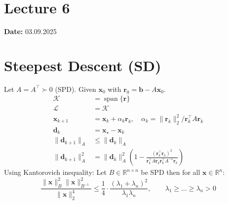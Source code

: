 \section{Lecture 6}
\textbf{Date:} 03.09.2025

\section*{Steepest Descent (SD)}
Let $A = A^{\top} \succ 0$ (SPD). Given $\mathbf{x}_0$ with $\mathbf{r}_0 = \mathbf{b} - A\mathbf{x}_0$.
\begin{align*}
    \mathcal{K}              & = \operatorname{span}\{\mathbf{r}\}                                                                                                                            \\
    \mathcal{L}              & = \mathcal{K}                                                                                                                                                  \\
    \mathbf{x}_{k+1}         & = \mathbf{x}_k + \alpha_k \mathbf{r}_k, \quad \alpha_k = \|\mathbf{r}_k\|_2^2 / \mathbf{r}_k^{\top} A \mathbf{r}_k                                             \\
    \mathbf{d}_k             & = \mathbf{x}_{\star} - \mathbf{x}_k                                                                                                                            \\
    \|\mathbf{d}_{k+1}\|_A   & \leq \|\mathbf{d}_k\|_A                                                                                                                                        \\
    \|\mathbf{d}_{k+1}\|_A^2 & = \|\mathbf{d}_k\|_A^2\left(1 - \frac{(\mathbf{r}_k^{\top} \mathbf{r}_k)^2}{\mathbf{r}_k^{\top} A \mathbf{r}_k \mathbf{r}_k^{\top} A^{-1} \mathbf{r}_k}\right)
\end{align*}
Using Kantorovich inequality: Let $B \in \mathbb{R}^{n \times n}$ be SPD then for all $\mathbf{x} \in \mathbb{R}^n$:
\[
    \frac{\|\mathbf{x}\|_B^2 \|\mathbf{x}\|_{B^{-1}}^2}{\|\mathbf{x}\|_2^4} \leq \frac{1}{4}\cdot\frac{(\lambda_1 + \lambda_n)^2}{\lambda_1 \lambda_n}, \qquad \lambda_1 \geq \ldots \geq \lambda_n > 0
\]

